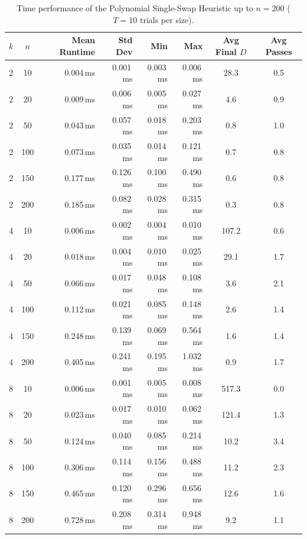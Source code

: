 \documentclass[11pt,a4paper]{article}
\begin{document}
\begin{table}[H]
\centering
\footnotesize
\setlength{\tabcolsep}{4.5pt}
\caption{Time performance of the Polynomial Single-Swap Heuristic up to $n=200$ ($T=10$ trials per size).}
\label{tab:poly_runtime}
\begin{tabular}{ccrrrrcc}
\toprule
$k$ & $n$ & Mean Runtime & Std Dev & Min & Max & Avg Final $D$ & Avg Passes \\
\midrule
2 & 10  & 0.004\,ms & 0.001\,ms & 0.003\,ms & 0.006\,ms & 28.3 & 0.5 \\
2 & 20  & 0.009\,ms & 0.006\,ms & 0.005\,ms & 0.027\,ms & 4.6  & 0.9 \\
2 & 50  & 0.043\,ms & 0.057\,ms & 0.018\,ms & 0.203\,ms & 0.8  & 1.0 \\
2 & 100 & 0.073\,ms & 0.035\,ms & 0.014\,ms & 0.121\,ms & 0.7  & 0.8 \\
2 & 150 & 0.177\,ms & 0.126\,ms & 0.100\,ms & 0.490\,ms & 0.6  & 0.8 \\
2 & 200 & 0.185\,ms & 0.082\,ms & 0.028\,ms & 0.315\,ms & 0.3  & 0.8 \\
\midrule
4 & 10  & 0.006\,ms & 0.002\,ms & 0.004\,ms & 0.010\,ms & 107.2 & 0.6 \\
4 & 20  & 0.018\,ms & 0.004\,ms & 0.010\,ms & 0.025\,ms & 29.1  & 1.7 \\
4 & 50  & 0.066\,ms & 0.017\,ms & 0.048\,ms & 0.108\,ms & 3.6   & 2.1 \\
4 & 100 & 0.112\,ms & 0.021\,ms & 0.085\,ms & 0.148\,ms & 2.6   & 1.4 \\
4 & 150 & 0.248\,ms & 0.139\,ms & 0.069\,ms & 0.564\,ms & 1.6   & 1.4 \\
4 & 200 & 0.405\,ms & 0.241\,ms & 0.195\,ms & 1.032\,ms & 0.9   & 1.7 \\
\midrule
8 & 10  & 0.006\,ms & 0.001\,ms & 0.005\,ms & 0.008\,ms & 517.3 & 0.0 \\
8 & 20  & 0.023\,ms & 0.017\,ms & 0.010\,ms & 0.062\,ms & 121.4 & 1.3 \\
8 & 50  & 0.124\,ms & 0.040\,ms & 0.085\,ms & 0.214\,ms & 10.2  & 3.4 \\
8 & 100 & 0.306\,ms & 0.114\,ms & 0.156\,ms & 0.488\,ms & 11.2  & 2.3 \\
8 & 150 & 0.465\,ms & 0.120\,ms & 0.296\,ms & 0.656\,ms & 12.6  & 1.6 \\
8 & 200 & 0.728\,ms & 0.208\,ms & 0.314\,ms & 0.948\,ms & 9.2   & 1.1 \\
\bottomrule
\end{tabular}
\end{table}
\end{document}
